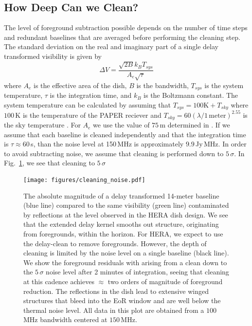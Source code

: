 \documentclass[onecolumn]{emulateapj}
\begin{document}
\subsection{How Deep Can we Clean?}
The level of foreground subtraction possible depends on the number of time steps and redundant baselines that are averaged before performing the cleaning step. The standard deviation on the real and imaginary part of a single delay transformed visibility is given by \citep{Morales:2004}
\begin{equation}
\Delta V = \frac{\sqrt{2 B} k_B T_{sys}}{A_e \sqrt{\tau}}
\end{equation}
where $A_e$ is the effective area of the dish, $B$ is the bandwidth, $T_{sys}$ is the system temperature, $\tau$ is the integration time, and $k_B$ is the Boltzmann constant. The system temperature can be calculated by assuming that $T_{sys} = 100\text{K} + T_{sky}$ where $100$\,K is the temperature of the PAPER reciever and $T_{sky} = 60 (\lambda/1\,\text{meter} )^{2.55}$ is the sky temperature \citep{Fixsen:2008}. For $A_e$ we use the value of $75$\,m determined in \citep{Neben:2015b}. If we assume that each baseline is cleaned independently and that the integration time is $\tau \approx 60$\,s, than the noise level at 150\,MHz is approximately $9.9$\,Jy\,MHz. In order to avoid subtracting noise, we assume that cleaning is performed down to $5\,\sigma$. In Fig.~\ref{fig:Cleaning}, we see that cleaning to $5\,\sigma$ 

\begin{figure}
\texttt{[image: figures/cleaning\_noise.pdf]}
\caption{The absolute magnitude of a delay transformed 14-meter baseline (blue line) compared to the same visibility (green line) contaminated by reflections at the level observed in the HERA dish design. We see that the extended delay kernel smooths out structure, originating from foregrounds, within the horizon. For HERA, we expect to use the delay-clean to remove foregrounds. However, the depth of cleaning is limited by the noise level on a single baseline (black line). We show the foreground residuals with arising from a clean down to the $5\,\sigma$ noise level after 2 minutes of integration, seeing that cleaning at this cadence achieves $\approx$ two orders of magnitude of foreground reduction. The reflections in the dish lead to extensive winged structures that bleed into the EoR window and are well below the thermal noise level. All data in this plot are obtained from a $100$\,MHz bandwidth centered at $150$\,MHz.}
\label{fig:Cleaning}
\end{figure}
\end{document}
